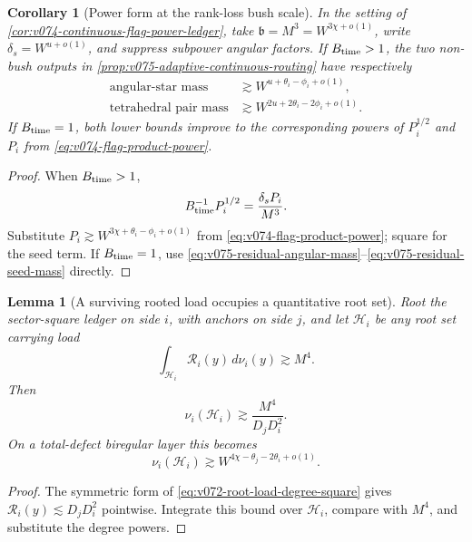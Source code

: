 \documentclass[10pt]{article}
\newtheorem{lemma}[theorem]{Lemma}
\newtheorem{corollary}[theorem]{Corollary}
\begin{document}
\begin{corollary}[Power form at the rank-loss bush scale]
\label{cor:v075-rank-loss-routing-powers}
In the setting of \cref{cor:v074-continuous-flag-power-ledger}, take
\(\mathfrak b=M^3=W^{3\chi+o(1)}\), write
\(\delta_s=W^{u+o(1)}\), and suppress subpower angular factors.  If
\(B_{\rm time}>1\), the two non-bush outputs in
\cref{prop:v075-adaptive-continuous-routing} have respectively
\begin{equation}
\label{eq:v075-angular-seed-power-ledger}
\boxed{
\begin{aligned}
\text{angular-star mass}
&\gtrsim
W^{u+\theta_i-\phi_i+o(1)},\\
\text{tetrahedral pair mass}
&\gtrsim
W^{2u+2\theta_i-2\phi_i+o(1)}.
\end{aligned}
}
\end{equation}
If \(B_{\rm time}=1\), both lower bounds improve to the corresponding powers of
\(P_i^{1/2}\) and \(P_i\) from \eqref{eq:v074-flag-product-power}.
\end{corollary}

\begin{proof}
When \(B_{\rm time}>1\),
\[
B_{\rm time}^{-1}P_i^{1/2}
=
\frac{\delta_sP_i}{M^3}.
\]
Substitute
\(P_i\gtrsim W^{3\chi+\theta_i-\phi_i+o(1)}\) from
\eqref{eq:v074-flag-product-power}; square for the seed term.  If \(B_{\rm time}=1\), use
\eqref{eq:v075-residual-angular-mass}--\eqref{eq:v075-residual-seed-mass} directly.
\end{proof}

\begin{lemma}[A surviving rooted load occupies a quantitative root set]
\label{lem:v076-high-root-support}
Root the sector-square ledger on side \(i\), with anchors on side \(j\), and let
\(\mathcal H_i\) be any root set carrying load
\[
\int_{\mathcal H_i}\mathcal R_i(y)\,d\nu_i(y)\gtrsim M^4.
\]
Then
\begin{equation}
\label{eq:v076-high-root-support}
\boxed{
\nu_i(\mathcal H_i)
\gtrsim
\frac{M^4}{D_jD_i^2}.
}
\end{equation}
On a total-defect biregular layer this becomes
\begin{equation}
\label{eq:v076-high-root-support-power}
\boxed{
\nu_i(\mathcal H_i)
\gtrsim
W^{4\chi-\theta_j-2\theta_i+o(1)}.
}
\end{equation}
\end{lemma}

\begin{proof}
The symmetric form of \eqref{eq:v072-root-load-degree-square} gives
\(\mathcal R_i(y)\lesssim D_jD_i^2\) pointwise.  Integrate this bound over
\(\mathcal H_i\), compare with \(M^4\), and substitute the degree powers.
\end{proof}
\end{document}
